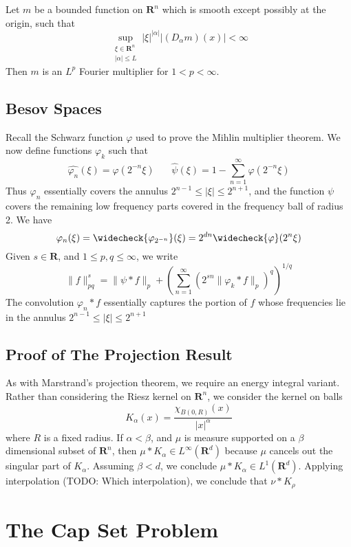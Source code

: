 \begin{theorem}
	Let $m$ be a bounded function on $\mathbf{R}^n$ which is smooth except possibly at the origin, such that
	\[ \sup_{\substack{\xi \in \mathbf{R}^n\\|\alpha| \leq L}} |\xi|^{|\alpha|} |(D_\alpha m)(x)| < \infty \]
	Then $m$ is an $L^p$ Fourier multiplier for $1 < p < \infty$.
\end{theorem}

\section{Besov Spaces}

Recall the Schwarz function $\varphi$ used to prove the Mihlin multiplier theorem. We now define functions $\varphi_k$ such that
%
\[ \widehat{\varphi_n}(\xi) = \varphi(2^{-n} \xi)\ \ \ \ \ \ \ \ \widehat{\psi}(\xi) = 1 - \sum_{n = 1}^\infty \varphi(2^{-n} \xi) \]
%
Thus $\varphi_n$ essentially covers the annulus $2^{n-1} \leq |\xi| \leq 2^{n+1}$, and the function $\psi$ covers the remaining low frequency parts covered in the frequency ball of radius 2. We have
%
\[ \varphi_n(\xi) = \widecheck{\varphi_{2^{-n}}}(\xi) = 2^{dn} \widecheck{\varphi}(2^n \xi) \]
%
Given $s \in \mathbf{R}$, and $1 \leq p, q \leq \infty$, we write
%
\[ \| f \|_{pq}^s = \| \psi * f \|_p + \left( \sum_{n = 1}^\infty (2^{sn} \| \varphi_k * f \|_p)^q \right)^{1/q} \]
%
The convolution $\varphi_n * f$ essentially captures the portion of $f$ whose frequencies lie in the annulus $2^{n-1} \leq |\xi| \leq 2^{n+1}$

\section{Proof of The Projection Result}

As with Marstrand's projection theorem, we require an energy integral variant. Rather than considering the Riesz kernel on $\mathbf{R}^n$, we consider the kernel on balls
%
\[ K_\alpha(x) = \frac{\chi_{B(0,R)}(x)}{|x|^\alpha} \]
%
where $R$ is a fixed radius. If $\alpha < \beta$, and $\mu$ is measure supported on a $\beta$ dimensional subset of $\mathbf{R}^n$, then $\mu * K_\alpha \in L^\infty(\mathbf{R}^d)$ because $\mu$ cancels out the singular part of $K_\alpha$. Assuming $\beta < d$, we conclude $\mu * K_\alpha \in L^1(\mathbf{R}^d)$. Applying interpolation (TODO: Which interpolation), we conclude that $\nu * K_\rho$ 

\chapter{The Cap Set Problem}

